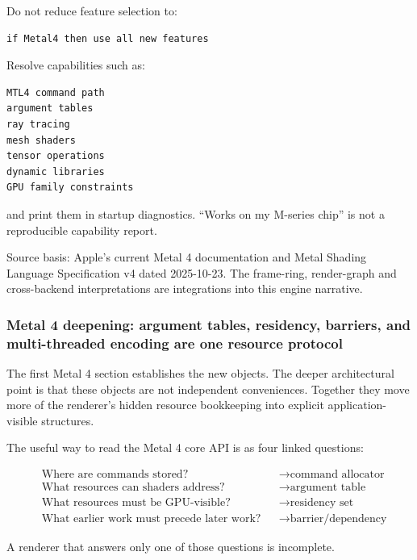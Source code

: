 Do not reduce feature selection to:

\begin{verbatim}
if Metal4 then use all new features
\end{verbatim}

Resolve capabilities such as:

\begin{verbatim}
MTL4 command path
argument tables
ray tracing
mesh shaders
tensor operations
dynamic libraries
GPU family constraints
\end{verbatim}

and print them in startup diagnostics. ``Works on my M-series chip'' is not a reproducible capability report.

Source basis: Apple's current Metal 4 documentation and Metal Shading Language Specification v4 dated 2025-10-23. The frame-ring, render-graph and cross-backend interpretations are integrations into this engine narrative.

\subsubsection{Metal 4 deepening: argument tables, residency, barriers, and multi-threaded encoding are one resource protocol}\label{metal-4-deepening-argument-tables-residency-barriers-and-multi-threaded-encoding-are-one-resource-protocol}

The first Metal 4 section establishes the new objects. The deeper architectural point is that these objects are not independent conveniences. Together they move more of the renderer's hidden resource bookkeeping into explicit application-visible structures.

The useful way to read the Metal 4 core API is as four linked questions:

\[
\boxed{
\begin{aligned}
&\text{Where are commands stored?} &&\rightarrow \text{command allocator}\\
&\text{What resources can shaders address?} &&\rightarrow \text{argument table}\\
&\text{What resources must be GPU-visible?} &&\rightarrow \text{residency set}\\
&\text{What earlier work must precede later work?} &&\rightarrow \text{barrier/dependency}
\end{aligned}
}
\]

A renderer that answers only one of those questions is incomplete.

